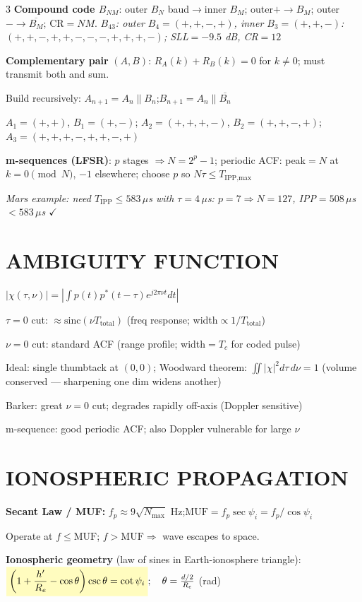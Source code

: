 \documentclass[6pt,landscape]{article}
\newcommand{\bx}[1]{\colorbox{yellow!25}{$\displaystyle #1$}}
\begin{document}
\begin{multicols}{3}
\textbf{Compound code $B_{NM}$}: outer $B_N$ baud$\to$inner $B_M$; outer$+\to B_M$; outer$-\to\overline{B_M}$; CR$=NM$. 
\textit{$B_{43}$: outer $B_4=(+,+,-,+)$, inner $B_3=(+,+,-)$: $(+,+,-,+,+,-,-,-,+,+,+,-)$; SLL$=-9.5$ dB, CR$=12$}

\textbf{Complementary pair} $(A,B)$: $R_A(k)+R_B(k)=0$ for $k\neq0$; must transmit both and sum.

Build recursively: $A_{n+1}=A_n\|B_n$;\quad $B_{n+1}=A_n\|\overline{B_n}$

$A_1=(+,+)$, $B_1=(+,-)$; $A_2=(+,+,+,-)$, $B_2=(+,+,-,+)$; $A_3=(+,+,+,-,+,+,-,+)$

\textbf{m-sequences (LFSR)}: $p$ stages $\Rightarrow N=2^p-1$; periodic ACF: peak$=N$ at $k=0\pmod{N}$, $-1$ elsewhere; choose $p$ so $N\tau\leq T_\text{IPP,max}$

\textit{Mars example: need $T_\text{IPP}\leq583\,\mu$s with $\tau=4\,\mu$s: $p=7\Rightarrow N=127$, IPP$=508\,\mu$s $<583\,\mu$s $\checkmark$}

\section*{AMBIGUITY FUNCTION}
$|\chi(\tau,\nu)|=|\int p(t)p^*(t-\tau)e^{j2\pi\nu t}dt|$

$\tau=0$ cut: $\approx\text{sinc}(\nu T_\text{total})$ (freq response; width$\propto1/T_\text{total}$)

$\nu=0$ cut: standard ACF (range profile; width$=T_c$ for coded pulse)

Ideal: single thumbtack at $(0,0)$; Woodward theorem: $\iint|\chi|^2 d\tau\,d\nu=1$ (volume conserved — sharpening one dim widens another)

Barker: great $\nu=0$ cut; degrades rapidly off-axis (Doppler sensitive)

m-sequence: good periodic ACF; also Doppler vulnerable for large $\nu$

\section*{IONOSPHERIC PROPAGATION}
\textbf{Secant Law / MUF:} $f_p\approx9\sqrt{N_\text{max}}$ Hz;\quad \bx{\text{MUF}=f_p\sec\psi_i=f_p/\cos\psi_i}

Operate at $f\leq\text{MUF}$; $f>\text{MUF}\Rightarrow$ wave escapes to space.

\textbf{Ionospheric geometry} (law of sines in Earth-ionosphere triangle):
$\bx{\left(1+\frac{h'}{R_e}-\cos\theta\right)\csc\theta=\cot\psi_i};\quad\theta=\frac{d/2}{R_e}$ (rad)


\end{multicols}
\end{document}
